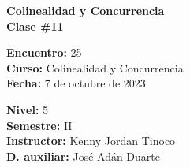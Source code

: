 \begin{center} \textbf
{
    \Large Colinealidad y Concurrencia \\ \vspace{2mm}Clase \#11
}
\end{center}

\begin{multicols}{2}
{
    \textbf{Encuentro:} 25\\
    \textbf{Curso:} Colinealidad y Concurrencia\\
    \textbf{Fecha:} 7 de octubre de 2023\\
    \begin{flushright}
        \textbf{Nivel:} 5\\
        \textbf{Semestre:} II\\
        \textbf{Instructor:} Kenny Jordan Tinoco\\
        \textbf{D. auxiliar:} José Adán Duarte
    \end{flushright}
}
\end{multicols}

\thispagestyle{first-page-style}
